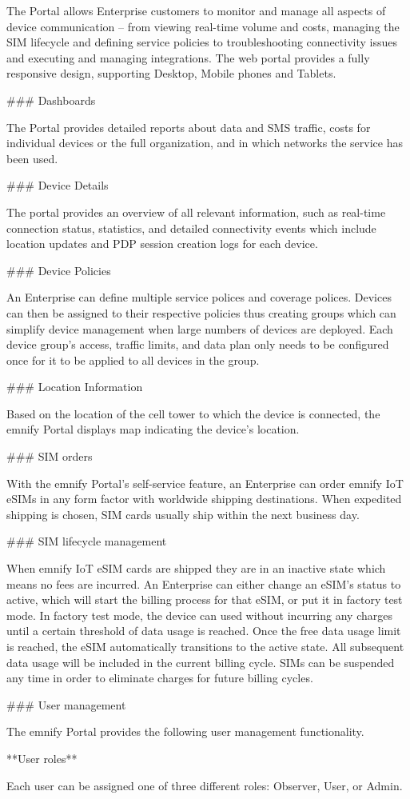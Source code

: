 \documentclass[11pt, oneside]{article}   	%
\begin{document}
\begin{markdown}
The Portal allows Enterprise customers to monitor and manage all aspects of device communication -- from viewing real-time volume and costs, managing the SIM lifecycle and defining service policies to troubleshooting connectivity issues and executing and managing integrations. 
The web portal provides a fully responsive design, supporting Desktop, Mobile phones and Tablets.

### Dashboards

The Portal provides detailed reports about data and SMS traffic, costs for individual devices or the full organization, and in which networks the service has been used.

### Device Details

The portal provides an overview of all relevant information, such as real-time connection status, statistics, and detailed connectivity events which include location updates and PDP session creation logs for each device.

### Device Policies

An Enterprise can define multiple service polices and coverage polices.
Devices can then be assigned to their respective policies thus creating groups which can simplify device management when large numbers of devices are deployed.
Each device group's access, traffic limits, and data plan only needs to be configured once for it to be applied to all devices in the group.

### Location Information

Based on the location of the cell tower to which the device is connected, the emnify Portal displays map indicating the device's location.

### SIM orders

With the emnify Portal's self-service feature, an Enterprise can order emnify IoT eSIMs in any form factor with worldwide shipping destinations.
When expedited shipping is chosen, SIM cards usually ship within the next business day. 

### SIM lifecycle management

When emnify IoT eSIM cards are shipped they are in an inactive state which means no fees are incurred.
An Enterprise can either change an eSIM's status to active, which will start the billing process for that eSIM, or put it in factory test mode.
In factory test mode, the device can used without incurring any charges until a certain threshold of data usage is reached.
Once the free data usage limit is reached, the eSIM automatically transitions to the active state.
All subsequent data usage will be included in the current billing cycle. 
SIMs can be suspended any time in order to eliminate charges for future billing cycles. 

### User management

The emnify Portal provides the following user management functionality. 

**User roles**

Each user can be assigned one of three different roles: Observer, User, or Admin. 
\end{markdown}
\end{document}
